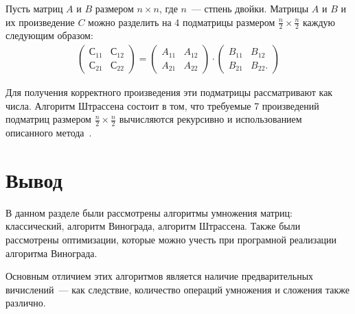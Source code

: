 Пусть матриц $A$ и $B$ размером $n \times n$, где $n$~--- стпень двойки.
Матрицы $A$ и $B$ и их произведение $C$ можно разделить на 4 подматрицы размером $\frac{n}{2} \times \frac{n}{2}$ каждую следующим образом:
\begin{equation}
    \label{eq:strassen_2}
    \begin{gathered}
        \begin{pmatrix}
            С_{11} & С_{12} \\
            С_{21} & С_{22} 
        \end{pmatrix}
        = 
        \begin{pmatrix}
            A_{11} & A_{12} \\
            A_{21} & A_{22} 
        \end{pmatrix}
        \cdot
        \begin{pmatrix}
            B_{11} & B_{12} \\
            B_{21} & B_{22}. 
        \end{pmatrix}
    \end{gathered}
\end{equation}

Для получения корректного произведения эти подматрицы рассматривают как числа.
Алгоритм Штрассена состоит в том, что требуемые 7 произведений подматриц размером $\frac{n}{2} \times \frac{n}{2}$ вычисляются рекурсивно и использованием описанного метода~\cite{strassen}.

\section*{Вывод}
В данном разделе были рассмотрены алгоритмы умножения матриц: классический, алгоритм Винограда, алгоритм Штрассена. Также были рассмотрены оптимизации, которые можно учесть при програмной реализации алгоритма Винограда.

Основным отличием этих алгоритмов является наличие предварительных вичислений~--- как следствие, количество операций умножения и сложения также различно.